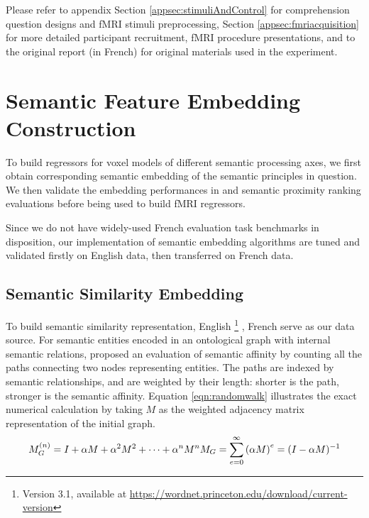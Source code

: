 Please refer to appendix Section \ref{appsec:stimuliAndControl} for comprehension question designs and fMRI stimuli preprocessing, Section \ref{appsec:fmriacquisition} for more detailed participant recruitment, fMRI procedure presentations, and to the original report (in French) \parencite{todorovicAnalysesIRMfLors2018} for original materials used in the experiment.

\section{Semantic Feature Embedding Construction}

To build regressors for voxel models of different semantic processing axes, we first obtain corresponding semantic embedding of the semantic principles in question. We then validate the embedding performances in \similarity and \association semantic proximity ranking evaluations before being used to build fMRI regressors.

Since we do not have widely-used French evaluation task benchmarks in disposition, our implementation of semantic embedding algorithms are tuned and validated firstly on English data, then transferred on French data. 


\subsection{Semantic Similarity Embedding}
\label{subsec:semanticsimilaritymethod}
To build semantic similarity representation, English \footnote{Version 3.1, available at \url{https://wordnet.princeton.edu/download/current-version}} \parencite{millerWordNetLexicalDatabase1995, millerWordNetElectronicLexical1998}, French  \parencite{sagotBuildingFreeFrench2008} serve as our data source. For semantic entities encoded in an ontological graph with internal semantic relations, \textcite{saediWordNetEmbeddings2018} proposed an evaluation of semantic affinity by counting all the paths connecting two nodes representing entities. The paths are indexed by semantic relationships, and are weighted by their length: shorter is the path, stronger is the semantic affinity. Equation \ref{eqn:randomwalk} illustrates the exact numerical calculation by taking \(M\) as the weighted adjacency matrix representation of the initial graph. 
\begin{equation}
    M_G^{(n)} = I + \alpha M + \alpha^2 M^2 + \dots + \alpha^n M^n \\
    M_G = \sum_{e=0}^{\infty}{(\alpha M)}^e = (I - \alpha M)^{-1}
\label{eqn:randomwalk}
    \end{equation}

